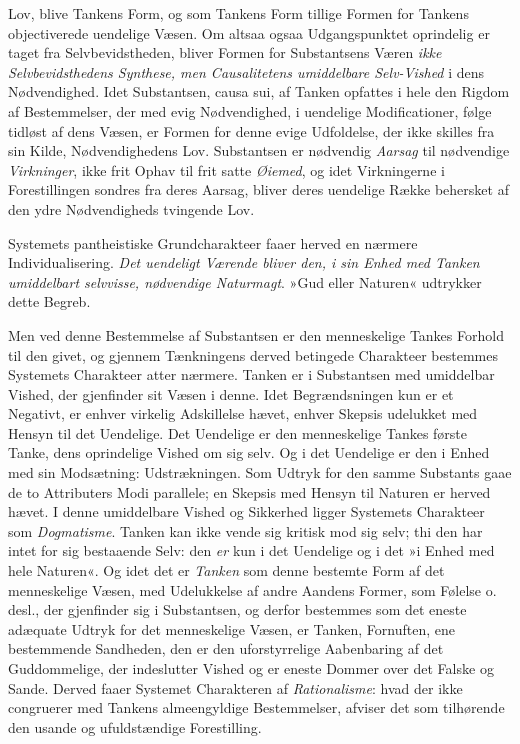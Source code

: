 \documentclass[12pt,a4paper]{book}
\newcommand{\opage}[1]{\marginnote{\footnotesize\textit{[#1]}}}
\begin{document}
Lov, blive Tankens Form, og som Tankens Form
tillige Formen for Tankens objectiverede uendelige Væsen.
Om altsaa ogsaa Udgangspunktet oprindelig er taget fra
Selvbevidstheden, bliver Formen for Substantsens Væren
\emph{ikke Selvbevidsthedens Synthese, men Causalitetens
umiddelbare Selv-Vished} i dens Nødvendighed. Idet Substantsen,
causa sui, af Tanken opfattes i hele
den Rigdom af Bestemmelser, der med evig Nødvendighed,
i uendelige Modificationer, følge tidløst af dens Væsen, er
Formen for denne evige Udfoldelse, der ikke skilles fra sin
Kilde, Nødvendighedens Lov. Substantsen er nødvendig
\emph{Aarsag} til nødvendige \emph{Virkninger}, ikke frit Ophav til
frit satte \emph{Øiemed}, og idet Virkningerne i Forestillingen
sondres fra deres Aarsag, bliver deres uendelige Række behersket
af den ydre Nødvendigheds tvingende Lov.

Systemets pantheistiske Grundcharakteer faaer herved
en nærmere Individualisering. \emph{Det uendeligt Værende
bliver den, i sin Enhed med Tanken umiddelbart selvvisse,
nødvendige Naturmagt}. »Gud eller Naturen« udtrykker
dette Begreb.

Men ved denne Bestemmelse af Substantsen er den
menneskelige Tankes Forhold til den givet, og gjennem
Tænkningens derved betingede Charakteer bestemmes Systemets
Charakteer atter nærmere. Tanken er i Substantsen
med umiddelbar Vished, der gjenfinder sit Væsen i denne.
Idet Begrændsningen kun er et Negativt, er enhver virkelig
\opage{173} Adskillelse hævet, enhver Skepsis udelukket med Hensyn
til det Uendelige. Det Uendelige er den menneskelige
Tankes første Tanke, dens oprindelige Vished om sig selv.
Og i det Uendelige er den i Enhed med sin Modsætning:
Udstrækningen. Som Udtryk for den samme Substants gaae
de to Attributers Modi parallele; en Skepsis med Hensyn
til Naturen er herved hævet. I denne umiddelbare Vished
og Sikkerhed ligger Systemets Charakteer som \emph{Dogmatisme}.
Tanken kan ikke vende sig kritisk mod sig selv;
thi den har intet for sig bestaaende Selv: den \emph{er} kun i det
Uendelige og i det »i Enhed med hele Naturen«. Og idet
det er \emph{Tanken} som denne bestemte Form af det menneskelige
Væsen, med Udelukkelse af andre Aandens Former,
som Følelse o. desl., der gjenfinder sig i Substantsen, og
derfor bestemmes som det eneste adæquate Udtryk for det
menneskelige Væsen, er Tanken, Fornuften, ene bestemmende
Sandheden, den er den uforstyrrelige Aabenbaring
af det Guddommelige, der indeslutter Vished og er eneste
Dommer over det Falske og Sande. Derved faaer Systemet
Charakteren af \emph{Rationalisme}: hvad der ikke congruerer
med Tankens almeengyldige Bestemmelser, afviser det som
tilhørende den usande og ufuldstændige Forestilling.
\end{document}
